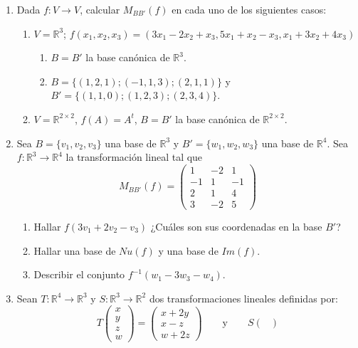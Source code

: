 \documentclass[12pt,letterpaper]{article}
\begin{document}
\begin{enumerate}
  \item Dada $f : V \to V$, calcular $M_{BB'}(f)$ en cada uno de los siguientes casos:
  \begin{enumerate}
    \item $V = \mathbb{R}^3$; $f(x_1, x_2, x_3) = (3x_1 - 2x_2 + x_3, 5x_1 + x_2 - x_3, x_1 + 3x_2 + 4x_3)$
    \begin{enumerate}
      \item $B = B'$ la base canónica de $\mathbb{R}^3$.
      \item $B = \{(1, 2, 1); (-1, 1, 3); (2, 1, 1)\}$ y $B' = \{(1, 1, 0); (1, 2, 3); (2, 3, 4)\}$.
    \end{enumerate}
    \item $V = \mathbb{R}^{2\times2}$, $f(A) = A^t$, $B = B'$ la base canónica de $\mathbb{R}^{2\times2}$.
  \end{enumerate}
  \item Sea $B = \{v_1, v_2, v_3\}$ una base de $\mathbb{R}^3$ y $B' = \{w_1, w_2, w_3\}$ una base de $\mathbb{R}^4$. Sea $f : \mathbb{R}^3\to\mathbb{R}^4$ la transformación lineal tal que
  $$
  M_{BB'}(f) = \begin{pmatrix}
    1 & -2 & 1\\
    -1 & 1 & -1\\
    2 & 1 & 4\\
    3 & -2 & 5
  \end{pmatrix}
  $$
  \begin{enumerate}
    \item Hallar $f(3v_1 + 2v_2 - v_3)$ ¿Cuáles son sus coordenadas en la base $B'$?
    \item Hallar una base de $Nu(f)$ y una base de $Im(f)$.
    \item Describir el conjunto $f^{-1}(w_1 - 3w_3 - w_4)$.
  \end{enumerate}
  \item Sean $T: \mathbb{R}^4\to\mathbb{R}^3$ y $S: \mathbb{R}^3\to\mathbb{R}^2$ dos transformaciones lineales definidas por:
  $$
  T\begin{pmatrix}
    x\\
    y\\
    z\\
    w
  \end{pmatrix}=\begin{pmatrix}
    x+2y\\
    x-z\\
    w+2z
    \end{pmatrix}\qquad\text{y}\qquad S\begin{pmatrix}

\end{pmatrix}$$
\end{enumerate}
\end{document}
